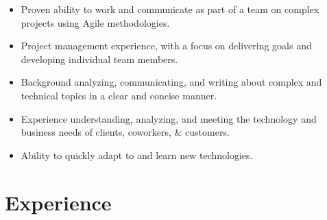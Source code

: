 \documentclass[10pt]{article}
\begin{document}
\begin{itemize}

    \item Proven ability to work and communicate as part of a team on complex projects using Agile methodologies.
    
    \item Project management experience, with a focus on delivering goals and developing individual team members.

    \item Background analyzing, communicating, and writing about complex and technical topics in a clear and concise manner.

    \item Experience understanding, analyzing, and meeting the technology and business needs of clients, coworkers, \& customers.

    \item Ability to quickly adapt to and learn new technologies.

\end{itemize}



\section{Experience}
\end{document}
